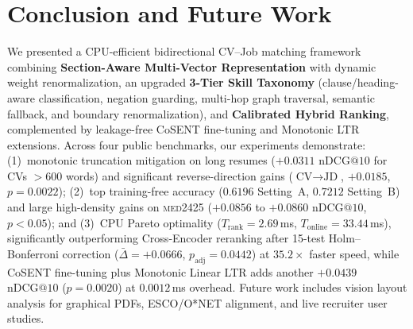 \section{Conclusion and Future Work}

We presented a CPU-efficient bidirectional CV--Job matching framework combining \textbf{Section-Aware Multi-Vector Representation} with dynamic weight renormalization, an upgraded \textbf{3-Tier Skill Taxonomy} (clause/heading-aware classification, negation guarding, multi-hop graph traversal, semantic fallback, and boundary renormalization), and \textbf{Calibrated Hybrid Ranking}, complemented by leakage-free CoSENT fine-tuning and Monotonic LTR extensions. Across four public benchmarks, our experiments demonstrate: (1)~monotonic truncation mitigation on long resumes ($+0.0311$ $\text{nDCG}@10$ for CVs $>600$ words) and significant reverse-direction gains ($\text{CV}\rightarrow\text{JD}$, $+0.0185$, $p=0.0022$); (2)~top training-free accuracy ($0.6196$ Setting~A, $0.7212$ Setting~B) and large high-density gains on \textsc{med2425} ($+0.0856$ to $+0.0860$ $\text{nDCG}@10$, $p<0.05$); and (3)~CPU Pareto optimality ($T_{\text{rank}}=2.69$\,ms, $T_{\text{online}}=33.44$\,ms), significantly outperforming Cross-Encoder reranking after 15-test Holm--Bonferroni correction ($\bar{\Delta}=+0.0666$, $p_{\text{adj}}=0.0442$) at $35.2\times$ faster speed, while CoSENT fine-tuning plus Monotonic Linear LTR adds another $+0.0439$ $\text{nDCG}@10$ ($p=0.0020$) at $0.0012$\,ms overhead. Future work includes vision layout analysis for graphical PDFs, ESCO/O*NET alignment, and live recruiter user studies.
